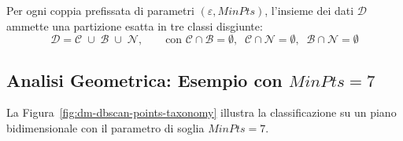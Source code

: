 \begin{property}
Per ogni coppia prefissata di parametri $(\varepsilon, MinPts)$, l'insieme dei dati $\mathcal{D}$ ammette una partizione esatta in tre classi disgiunte:
\begin{equation}
    \mathcal{D} = \mathcal{C} \;\cup\; \mathcal{B} \;\cup\; \mathcal{N}, \qquad \text{con } \mathcal{C} \cap \mathcal{B} = \emptyset, \;\; \mathcal{C} \cap \mathcal{N} = \emptyset, \;\; \mathcal{B} \cap \mathcal{N} = \emptyset
\end{equation}
\end{property}

\FloatBarrier
\subsection{Analisi Geometrica: Esempio con \texorpdfstring{$MinPts = 7$}{MinPts = 7}}

La Figura~\ref{fig:dm-dbscan-points-taxonomy} illustra la classificazione su un piano bidimensionale con il parametro di soglia $MinPts = 7$.

